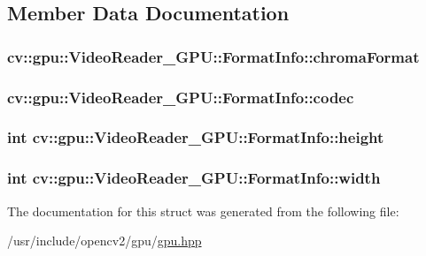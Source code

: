 \subsection{Member Data Documentation}
\hypertarget{structcv_1_1gpu_1_1VideoReader__GPU_1_1FormatInfo_a9400bdc8903cc435acbf37036a06225e}{
\subsubsection[{chroma\-Format}]{ cv\-::gpu\-::\-Video\-Reader\-\_\-\-G\-P\-U\-::\-Format\-Info\-::chroma\-Format}}\label{structcv_1_1gpu_1_1VideoReader__GPU_1_1FormatInfo_a9400bdc8903cc435acbf37036a06225e}
\hypertarget{structcv_1_1gpu_1_1VideoReader__GPU_1_1FormatInfo_aa5adba8a81873df9339c844822887ad3}{
\subsubsection[{codec}]{ cv\-::gpu\-::\-Video\-Reader\-\_\-\-G\-P\-U\-::\-Format\-Info\-::codec}}\label{structcv_1_1gpu_1_1VideoReader__GPU_1_1FormatInfo_aa5adba8a81873df9339c844822887ad3}
\hypertarget{structcv_1_1gpu_1_1VideoReader__GPU_1_1FormatInfo_a3922e3c3cb30e9dcb465db81176364ef}{
\subsubsection[{height}]{\setlength{\rightskip}{0pt plus 5cm}int cv\-::gpu\-::\-Video\-Reader\-\_\-\-G\-P\-U\-::\-Format\-Info\-::height}}\label{structcv_1_1gpu_1_1VideoReader__GPU_1_1FormatInfo_a3922e3c3cb30e9dcb465db81176364ef}
\hypertarget{structcv_1_1gpu_1_1VideoReader__GPU_1_1FormatInfo_adc76516e2ddf81180fe8eb29719223c1}{
\subsubsection[{width}]{\setlength{\rightskip}{0pt plus 5cm}int cv\-::gpu\-::\-Video\-Reader\-\_\-\-G\-P\-U\-::\-Format\-Info\-::width}}\label{structcv_1_1gpu_1_1VideoReader__GPU_1_1FormatInfo_adc76516e2ddf81180fe8eb29719223c1}


The documentation for this struct was generated from the following file\-:\begin{DoxyCompactItemize}
\item 
/usr/include/opencv2/gpu/\hyperlink{gpu_2gpu_8hpp}{gpu.\-hpp}\end{DoxyCompactItemize}
